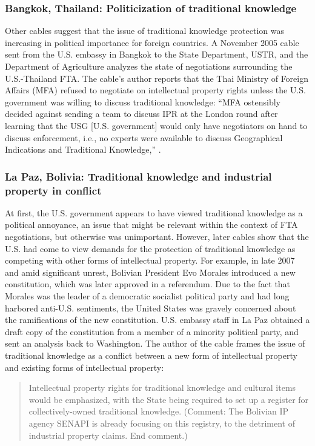 \documentclass[12pt]{article}
\begin{document}
\subsubsection{Bangkok, Thailand: Politicization of traditional knowledge}
Other cables suggest that the issue of traditional knowledge protection was increasing in political 
importance for foreign countries. A November 2005 cable sent from the U.S. embassy in Bangkok to the 
State Department, 
USTR, and the Department of Agriculture analyzes the state of negotiations surrounding the 
U.S.-Thailand FTA.
The cable's author reports that the Thai Ministry of Foreign Affairs (MFA) refused to negotiate on  
intellectual property rights unless the U.S. government was willing to discuss traditional knowledge: 
``MFA ostensibly decided against sending a team to discuss IPR at the London round after learning that 
the USG [U.S. government] would only have negotiators on hand to discuss enforcement, i.e., no experts were available to 
discuss Geographical Indications and Traditional 
Knowledge,'' \citep{u.s._department_of_state2005u.s.-thailand}.

\subsubsection{La Paz, Bolivia: Traditional knowledge and industrial property in conflict}
At first, the U.S. government appears to have viewed traditional knowledge as a political annoyance, 
an issue that might be relevant within the context of FTA negotiations, but otherwise was 
unimportant. However, later cables show that the U.S. had come to view demands for the protection 
of traditional knowledge as competing with other forms of intellectual property. For example, 
in late 2007 and amid significant unrest, Bolivian President Evo Morales introduced a new 
constitution, which was later approved in a referendum. Due to the fact that Morales was the 
leader of a democratic socialist political party and had 
long harbored anti-U.S. sentiments, the United States was gravely concerned about the ramifications 
of the new constitution. U.S. embassy staff in La Paz obtained a draft copy of the constitution from a 
member of a minority political party, and sent an analysis back to Washington. The author of the cable 
frames the issue of traditional knowledge as a conflict between a new form of intellectual property 
and existing forms of intellectual property:
\begin{quote}Intellectual property
rights for traditional knowledge and cultural items would be emphasized, with the State being required 
to set up a register for collectively-owned traditional knowledge. (Comment: The Bolivian IP agency 
SENAPI is already focusing on this registry, to the detriment of industrial property claims. 
End comment.) \citep{u.s._department_of_state2007bolivia:}
\end{quote}
\end{document}
